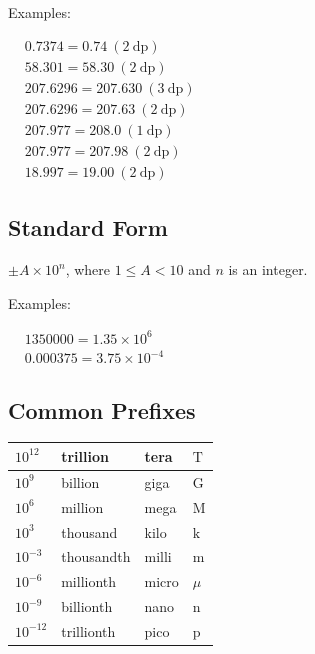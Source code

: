 \documentclass[twocolumn]{article}
\begin{document}
\noindent 
Examples:

\noindent
$
\begin{aligned}
	& 0.7374=0.74 \ (2 \ \mathrm{dp}) \\
	& 58.301=58.30 \ (2 \ \mathrm{dp}) \\
	& 207.6296=207.630 \ (3 \ \mathrm{dp}) \\
	& 207.6296=207.63 \ (2 \ \mathrm{dp}) \\
    & 207.977=208.0 \ (1 \ \mathrm{dp}) \\
    & 207.977=207.98 \ (2 \ \mathrm{dp}) \\
    & 18.997=19.00 \ (2 \ \mathrm{dp})
\end{aligned}
$

\subsection*{Standard Form}

\noindent
$\pm A \times 10^n$, where $1 \leq A < 10$ and $n$ is an integer.

\bigskip 

\noindent
Examples:

\noindent
$
\begin{aligned}
	& 1350000=1.35 \times 10^6 \\
	& 0.000375=3.75 \times 10^{-4}
\end{aligned}
$

\subsection*{Common Prefixes}

\begin{tabular}{|l|l|l|l|}
	\hline $10^{12}$ & trillion & tera & $\mathrm{T}$ \\
	\hline $10^9$ & billion & giga & $\mathrm{G}$ \\
	\hline $10^6$ & million & mega & $\mathrm{M}$ \\
	\hline $10^3$ & thousand & kilo & $\mathrm{k}$ \\
	\hline $10^{-3}$ & thousandth & milli & $\mathrm{m}$ \\
	\hline $10^{-6}$ & millionth & micro & $\mu$ \\
	\hline $10^{-9}$ & billionth & nano & $\mathrm{n}$ \\
	\hline $10^{-12}$ & trillionth & pico & $\mathrm{p}$ \\
	\hline
\end{tabular}
\end{document}
